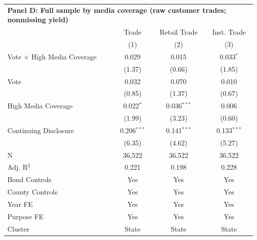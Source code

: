 \begingroup
\centering
\begin{tabular*}{\textwidth}{@{\extracolsep{\fill}}lccc}
\multicolumn{5}{l}{\textbf{Panel D: Full sample by media coverage (raw customer trades; nonmissing yield)}}\\

\addlinespace
   \toprule
                                      & Trade         & Retail Trade  & Inst. Trade\\  
                                      & (1)           & (2)           & (3)\\  
   \midrule 
   Vote $\times$ High Media Coverage  & 0.029         & 0.015         & 0.033$^{*}$\\   
                                      & (1.37)       & (0.66)       & (1.85)\\   
   Vote                               & 0.032         & 0.070         & 0.010\\   
                                      & (0.85)       & (1.37)       & (0.67)\\   
   High Media Coverage                & 0.022$^{*}$   & 0.036$^{***}$ & 0.006\\   
                                      & (1.99)       & (3.23)       & (0.60)\\   
   Continuing Disclosure              & 0.206$^{***}$ & 0.141$^{***}$ & 0.133$^{***}$\\   
                                      & (6.35)       & (4.62)       & (5.27)\\   
   \hline
   N                       & 36,522        & 36,522        & 36,522\\  
   Adj. R$^2$                     & 0.221         & 0.198         & 0.228\\  
   Bond Controls                      & Yes           & Yes           & Yes\\  
   County Controls                    & Yes           & Yes           & Yes\\  
   Year FE                            & Yes           & Yes           & Yes\\  
   Purpose FE                         & Yes           & Yes           & Yes\\  
   Cluster              & State & State & State\\  
   \bottomrule
\end{tabular*}
\par\endgroup
